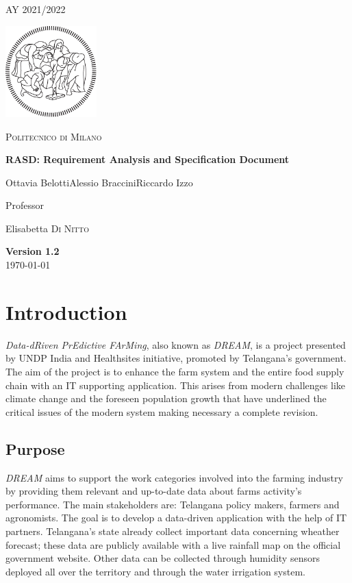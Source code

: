 \documentclass[table, 12pt]{article}
\begin{document}
\begin{titlepage}
    \centering
    {\scshape\large AY 2021/2022 \par}
    \vfill
    \includegraphics[width=100pt]{assets/logo-polimi-new}\par\vspace{1cm}
    {\scshape\LARGE Politecnico di Milano \par}
    \vspace{1.5cm}
    {\huge\bfseries RASD\@: Requirement Analysis
        and Specification Document \par}
    \vspace{2cm}
    {\Large {Ottavia Belotti\quad Alessio Braccini\quad Riccardo Izzo}\par}
    \vfill
    {\large Professor\par
        Elisabetta \textsc{Di Nitto}}
    \vfill
    {\large \textbf{Version 1.2}\\ \today \par}
\end{titlepage}


\thispagestyle{plain}
\mbox{}
\newpage
{}
\tableofcontents
\newpage
{}

\section{Introduction}
\emph{Data-dRiven PrEdictive FArMing}, also known as \emph{DREAM}, is a project presented by UNDP India and Healthsites initiative, promoted by Telangana's government.
The aim of the project is to enhance the farm system and the entire food supply chain with an IT supporting application. 
This arises from modern challenges like climate change and the foreseen population growth that have underlined the critical issues of the modern system making necessary a complete revision.


\subsection{Purpose} %
\emph{DREAM} aims to support the work categories involved into the farming industry by providing them relevant and up-to-date data about farms activity's performance. 
The main stakeholders are: Telangana policy makers, farmers and agronomists.
The goal is to develop a data-driven application with the help of IT partners.
Telangana's state already collect important data concerning wheather forecast; these data are publicly available with a live rainfall map on the official government website.
Other data can be collected through humidity sensors deployed all over the territory and through the water irrigation system.
\end{document}

